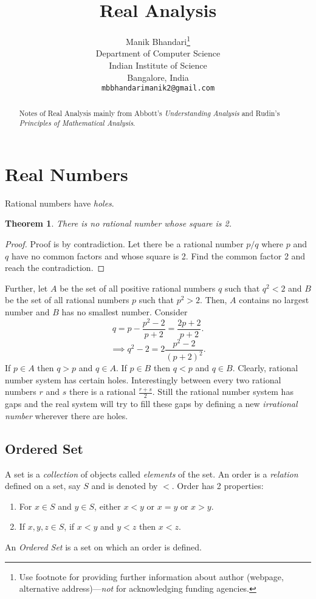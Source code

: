 \documentclass{article}
\title{Real Analysis}
\author{
	Manik Bhandari\thanks{Use footnote for providing further
		information about author (webpage, alternative
		address)---\emph{not} for acknowledging funding agencies.} \\
	Department of Computer Science\\
	Indian Institute of Science\\
	Bangalore, India \\
	\texttt{mbbhandarimanik2@gmail.com} \\
}
\newtheorem{theorem}{Theorem}
\begin{document}
	
	\maketitle
	
	\begin{abstract}
		Notes of Real Analysis mainly from Abbott's \textit{Understanding Analysis} and Rudin's \textit{Principles of Mathematical Analysis}.
	\end{abstract}
	
	\section{Real Numbers}
	Rational numbers have \emph{holes}.
	\begin{theorem}
		There is no rational number whose square is 2.
	\end{theorem}
	\begin{proof}
		Proof is by contradiction. Let there be a rational number $p/q$ where $p$ and $q$ have no common factors and whose square is 2.
		Find the common factor 2 and reach the contradiction.
	\end{proof}
	Further, let $A$ be the set of all positive rational numbers $q$ such that $q^2 < 2$ and $B$ be the set of all rational numbers $p$ 
	such that $p^2 > 2$. Then, $A$ contains no largest number and $B$ has no smallest number. Consider 
	\[q = p - \frac{p^2-2}{p+2} = \frac{2p+2}{p+2}.\]  \[\implies q^2 - 2 = 2\frac{p^2-2}{(p+2)^2}.\]
	If $p \in A$ then $q > p$  and $q \in A$. If $p \in B$ then $q < p$ and $q \in B$.
	Clearly, rational number system has certain holes. Interestingly between every two rational numbers $r$ and $s$ there is a rational $\frac{r+s}{2}.$
	Still the rational number system has gaps and the real system will try to fill these gaps by defining a new \emph{irrational number} wherever there
	are holes.
	
	\subsection{Ordered Set}
	A set is a \emph{collection} of objects called \emph{elements} of the set. An order is a \emph{relation} defined on a set, say $S$ and is denoted
	by $<$. Order has 2 properties:
	\begin{enumerate}
		\item For $x \in S$ and $y \in S$, either $x < y$ or $x = y$ or $x > y$.
		\item If $x,y,z \in S$, if $x < y$ and $y < z$ then $x < z$.
	\end{enumerate}
	An \emph{Ordered Set} is a set on which an order is defined.
\end{document}

